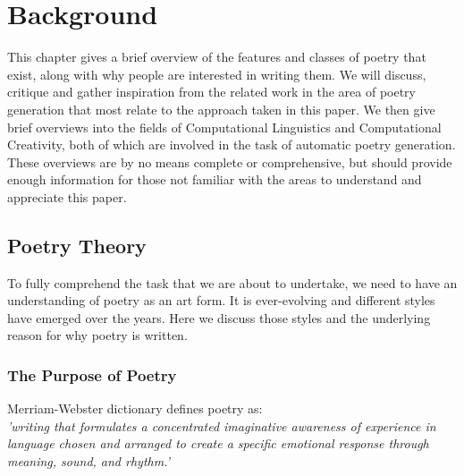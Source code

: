 
\chapter{Background}
\ifpdf
    \graphicspath{{Design/DesignFigs/PNG/}{Design/DesignFigs/PDF/}{Design/DesignFigs/}}
\else
    \graphicspath{{Design/DesignFigs/EPS/}{Design/DesignFigs/}}
\fi

This chapter gives a brief overview of the features and classes of poetry that exist, along with why people are interested in writing them. We will discuss, critique and gather inspiration from the related work in the area of poetry generation that most relate to the approach taken in this paper. We then give brief overviews into the fields of Computational Linguistics and Computational Creativity, both of which are involved in the task of automatic poetry generation. These overviews are by no means complete or comprehensive, but should provide enough information for those not familiar with the areas to understand and appreciate this paper.

\section{Poetry Theory}

To fully comprehend the task that we are about to undertake, we need to have an understanding of poetry as an art form. It is ever-evolving and different styles have emerged over the years. Here we discuss those styles and the underlying reason for why poetry is written.

\subsection{The Purpose of Poetry}
\label{sec:purpose}
Merriam-Webster dictionary defines poetry as:\\
\emph{'writing that formulates a concentrated imaginative awareness of experience in language chosen and arranged to create a specific emotional response through meaning, sound, and rhythm.'}

